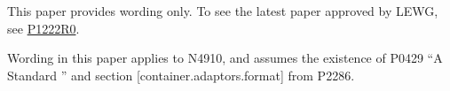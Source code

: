 
% 

This paper provides wording only.  To see the latest paper approved by LEWG,
see \href{https://www.open-std.org/jtc1/sc22/wg21/docs/papers/2018/p1222r0.pdf}{P1222R0}.

Wording in this paper applies to N4910, and assumes the existence of P0429 ``A
Standard '' and section [container.adaptors.format] from
P2286.

\markboth{\contentsname}{}

\makeatletter
\renewcommand\@pnumwidth{2.5em}
\makeatother

\tableofcontents
\setcounter{tocdepth}{5}

%
